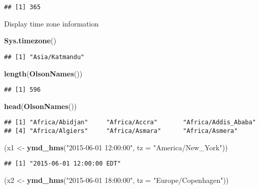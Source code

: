 \documentclass[
]{article}
\newenvironment{Shaded}{\begin{snugshade}}{\end{snugshade}}
\newcommand{\AttributeTok}[1]{\textcolor[rgb]{0.13,0.29,0.53}{#1}}
\newcommand{\FunctionTok}[1]{\textcolor[rgb]{0.13,0.29,0.53}{\textbf{#1}}}
\newcommand{\NormalTok}[1]{#1}
\newcommand{\OtherTok}[1]{\textcolor[rgb]{0.56,0.35,0.01}{#1}}
\newcommand{\StringTok}[1]{\textcolor[rgb]{0.31,0.60,0.02}{#1}}
\begin{document}
\begin{verbatim}
## [1] 365
\end{verbatim}

Display time zone information

\begin{Shaded}
\begin{Highlighting}[]
\FunctionTok{Sys.timezone}\NormalTok{()}
\end{Highlighting}
\end{Shaded}

\begin{verbatim}
## [1] "Asia/Katmandu"
\end{verbatim}

\begin{Shaded}
\begin{Highlighting}[]
\FunctionTok{length}\NormalTok{(}\FunctionTok{OlsonNames}\NormalTok{())}
\end{Highlighting}
\end{Shaded}

\begin{verbatim}
## [1] 596
\end{verbatim}

\begin{Shaded}
\begin{Highlighting}[]
\FunctionTok{head}\NormalTok{(}\FunctionTok{OlsonNames}\NormalTok{())}
\end{Highlighting}
\end{Shaded}

\begin{verbatim}
## [1] "Africa/Abidjan"     "Africa/Accra"       "Africa/Addis_Ababa"
## [4] "Africa/Algiers"     "Africa/Asmara"      "Africa/Asmera"
\end{verbatim}

\begin{Shaded}
\begin{Highlighting}[]
\NormalTok{(x1 }\OtherTok{\textless{}{-}} \FunctionTok{ymd\_hms}\NormalTok{(}\StringTok{"2015{-}06{-}01 12:00:00"}\NormalTok{, }\AttributeTok{tz =} \StringTok{"America/New\_York"}\NormalTok{))}
\end{Highlighting}
\end{Shaded}

\begin{verbatim}
## [1] "2015-06-01 12:00:00 EDT"
\end{verbatim}

\begin{Shaded}
\begin{Highlighting}[]
\NormalTok{(x2 }\OtherTok{\textless{}{-}} \FunctionTok{ymd\_hms}\NormalTok{(}\StringTok{"2015{-}06{-}01 18:00:00"}\NormalTok{, }\AttributeTok{tz =} \StringTok{"Europe/Copenhagen"}\NormalTok{))}
\end{Highlighting}
\end{Shaded}
\end{document}
